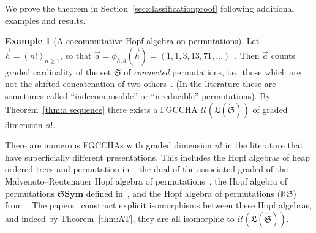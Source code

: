 \documentclass[11pt]{amsart}
\theoremstyle{definition}
\newtheorem{example}[theorem]{Example}
\numberwithin{equation}{section}
\def\ZZ{{\mathbb Z}}
\newcommand{\FGCCHAs}{\textsf{FGCCHA}s\xspace}
\begin{document}
We prove the theorem in Section~\ref{sec:classificationproof} following additional examples and results. 

\begin{example}[A cocommutative Hopf algebra on permutations]
\label{example:hopf_algebras_of_permutations}
    Let $\vec{h} = (n!)_{n \geq 1}$, so that $\vec{a} = \phi_{h,a}(\vec{h}) = (1,1,3,13,71,\ldots)$~\cite[\href{https://oeis.org/A003319}{A003319}]{OEIS}.  
    Then $\vec{a}$ counts graded cardinality of the set $\dot{\mathfrak{S}}$ of \emph{connected} permutations, i.e.~those which are not the shifted concatenation of two others~\cite{AS05}.  
    (In the literature these are sometimes called ``indecomposable'' or ``irreducible'' permutations).
    By Theorem~\ref{thm:a sequence} there exists a \textsf{FGCCHA}
    $\mathcal{U}(\mathfrak{L}(\dot{\mathfrak{S}}))$ of graded dimension $n!$.  
    
    There are numerous \FGCCHAs with graded dimension $n!$ in the literature that have superficially different presentations.  
    This includes the Hopf algebras of heap ordered trees and permutation in~\cite{GL09}, the dual of the associated graded of the Malvenuto--Reutenauer Hopf algebra of permutations~\cite{AS05cc}, the Hopf algebra of permutations $\mathbf{\mathfrak{S}Sym}$ defined in~\cite[\S 3]{HNT08}, and the Hopf algebra of permutations ($\mathbb{K}\mathfrak{S}$) from~\cite[\S 5]{Li15}.
    The papers~\cite{AS05cc, GL09, HNT08, Li15} construct explicit isomorphisms between these Hopf algebras, and indeed by Theorem~\ref{thm:AT}, they are all isomorphic to $\mathcal{U}(\mathfrak{L}(\dot{\mathfrak{S}}))$.
    \end{example}
\end{document}
